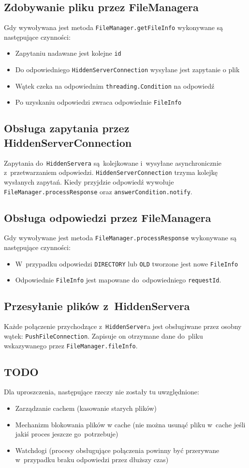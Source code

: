 \documentclass[a4paper,notitlepage]{article}
\begin{document}
\subsection{Zdobywanie pliku przez FileManagera}
Gdy wywoływana jest metoda \verb!FileManager.getFileInfo! 
wykonywane są następujące czynności:
\begin{itemize}
\item Zapytaniu nadawane jest kolejne \verb!id!
\item Do odpowiedniego \verb!HiddenServerConnection! wysyłane jest zapytanie 
o plik
\item Wątek czeka na odpowiednim \verb!threading.Condition! na odpowiedź
\item Po uzyskaniu odpowiedzi zwraca odpowiednie \verb!FileInfo!
\end{itemize}

\subsection{Obsługa zapytania przez HiddenServerConnection}
Zapytania do~\verb!HiddenServera! są~kolejkowane i~wysyłane
asynchronicznie z~przetwarzaniem odpowiedzi. \verb!HiddenServerConnection!
trzyma kolejkę wysłanych zapytań. Kiedy przyjdzie odpowiedź wywołuje 
\verb!FileManager.processResponse! oraz \verb!answerCondition.notify!.

\subsection{Obsługa odpowiedzi przez FileManagera}
Gdy wywoływane jest metoda \verb!FileManager.processResponse!
wykonywane są następujące czynności:
\begin{itemize}
\item W~przypadku odpowiedzi \verb!DIRECTORY! lub \verb!OLD! tworzone jest nowe
\verb!FileInfo!
\item Odpowiednie \verb!FileInfo! jest mapowane do~odpowiedniego 
\verb!requestId!.
\end{itemize}

\subsection{Przesyłanie plików z~HiddenServera}
Każde połączenie przychodzące z~\verb!HiddenServer!a jest obsługiwane przez
osobny wątek: \verb!PushFileConnection!. Zapisuje on otrzymane dane do~pliku
wskazywanego przez \verb!FileManager.fileInfo!.

\subsection{TODO}
Dla uproszczenia, następujące rzeczy nie zostały tu uwzględnione:
\begin{itemize}
\item Zarządzanie cachem (kasowanie starych plików)
\item Mechanizm blokowania plików w cache (nie można usunąć pliku w~cache 
jeśli jakiś proces jeszcze go~potrzebuje)
\item Watchdogi (procesy obsługujące połączenia powinny być przerywane
w~przypadku braku odpowiedzi przez dłuższy czas)
\end{itemize}
\end{document}
